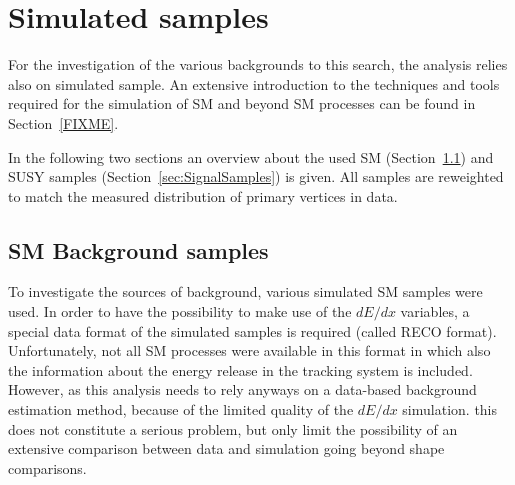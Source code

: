 \section{Simulated samples}
\label{sec:SimulatedSamples}

For the investigation of the various backgrounds to this search, the analysis relies also on simulated sample.
An extensive introduction to the techniques and tools required for the simulation of SM and beyond SM processes can be found in Section~\ref{FIXME}.

In the following two sections an overview about the used SM (Section~\ref{sec:SMSamples}) and SUSY samples (Section~\ref{sec:SignalSamples}) is given.
All samples are reweighted to match the measured distribution of primary vertices in data.

\subsection{SM Background samples}
\label{sec:SMSamples}
To investigate the sources of background, various simulated SM samples were used.
In order to have the possibility to make use of the $dE/dx$ variables, a special data format of the simulated samples is required (called RECO format).
Unfortunately, not all SM processes were available in this format in which also the information about the energy release in the tracking system is included.
However, as this analysis needs to rely anyways on a data-based background estimation method, because of the limited quality of the $dE/dx$ simulation.
this does not constitute a serious problem, but only limit the possibility of an extensive comparison between data and simulation going beyond shape comparisons.

